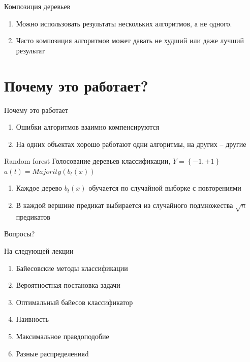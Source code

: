 \documentclass[10pt]{beamer}
\begin{document}
\begin{frame}{Композиция деревьев}
	\begin{enumerate} [--]
		\item Можно использовать результаты нескольких	алгоритмов, а не одного.
		\item Часто композиция алгоритмов может давать не худший или даже лучший результат
  \end{enumerate}
\end{frame}

\section{Почему это работает?}

\begin{frame}{Почему это работает}
	\begin{enumerate} [--]
		\item Ошибки алгоритмов взаимно компенсируются	
		\item На одних объектах хорошо работают одни алгоритмы, на других -- другие	
	\end{enumerate}
\end{frame}

\begin{frame}{Random forest}
	Голосование деревьев классификации, $Y = \left\{ -1, +1 \right\}$\\
	$a(t) = Majority(b_t(x))$%
	\begin{enumerate}[--]
  	  \item Каждое дерево $b_t(x)$ обучается по случайной выборке с повторениями
	  \item В каждой вершине предикат выбирается из случайного подмножества $\sqrt{n}$ предикатов
	\end{enumerate}
\end{frame}

\begin{frame}[standout]
  Вопросы?
\end{frame}

\appendix

\begin{frame}{На следующей лекции}
  	\begin{enumerate} [--]
		\item Байесовские методы классификации
		\item Вероятностная постановка задачи
		\item Оптимальный байесов классификатор
		\item Наивность
		\item Максимальное правдоподобие
		\item Разные распределенияd
	\end{enumerate}
\end{frame}
\end{document}

